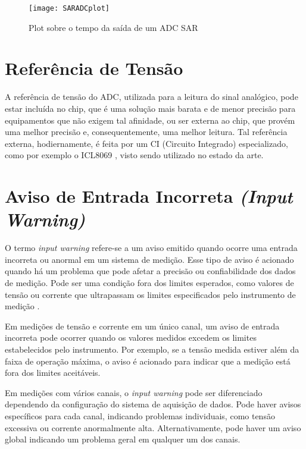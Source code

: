     \begin{figure}[htb!]%
        \caption{Plot sobre o tempo da saída de um ADC SAR}%
        \label{fig:SARADCplot}%
        \texttt{[image: SARADCplot]}%
    \end{figure} 

\section{Referência de Tensão}\label{sec:VoltageReference}

A referência de tensão do ADC, utilizada para a leitura do sinal analógico, pode estar incluída no chip, que é uma solução mais barata e de menor precisão para equipamentos que não exigem tal afinidade, ou ser externa ao chip, que provém uma melhor precisão e, consequentemente, uma melhor leitura. Tal referência externa, hodiernamente, é feita por um \gls{CI} (Circuito Integrado) especializado, como por exemplo o ICL8069 \cite{icl8069}, visto sendo utilizado no estado da arte. %

\section{Aviso de Entrada Incorreta \textit{(Input Warning)}}\label{sec:inpWarning}

O termo \textit{input warning} refere-se a um aviso emitido quando ocorre uma entrada incorreta ou anormal em um sistema de medição. Esse tipo de aviso é acionado quando há um problema que pode afetar a precisão ou confiabilidade dos dados de medição. Pode ser uma condição fora dos limites esperados, como valores de tensão ou corrente que ultrapassam os limites especificados pelo instrumento de medição \cite{base_alarms}.

Em medições de tensão e corrente em um único canal, um aviso de entrada incorreta pode ocorrer quando os valores medidos excedem os limites estabelecidos pelo instrumento. Por exemplo, se a tensão medida estiver além da faixa de operação máxima, o aviso é acionado para indicar que a medição está fora dos limites aceitáveis.

Em medições com vários canais, o \textit{input warning} pode ser diferenciado dependendo da configuração do sistema de aquisição de dados. Pode haver avisos específicos para cada canal, indicando problemas individuais, como tensão excessiva ou corrente anormalmente alta. Alternativamente, pode haver um aviso global indicando um problema geral em qualquer um dos canais.

